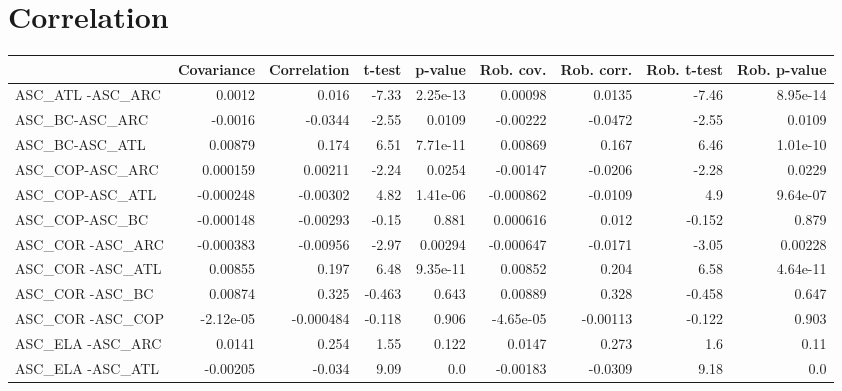 \section{Correlation}
\begin{tabular}{lrrrrrrrr}
\toprule
{} &  Covariance &  Correlation &  t-test &  p-value &  Rob. cov. &  Rob. corr. &  Rob. t-test &  Rob. p-value \\
\midrule
ASC\_ATL -ASC\_ARC                       &      0.0012 &        0.016 &   -7.33 & 2.25e-13 &    0.00098 &      0.0135 &        -7.46 &      8.95e-14 \\
ASC\_BC-ASC\_ARC                         &     -0.0016 &      -0.0344 &   -2.55 &   0.0109 &   -0.00222 &     -0.0472 &        -2.55 &        0.0109 \\
ASC\_BC-ASC\_ATL                         &     0.00879 &        0.174 &    6.51 & 7.71e-11 &    0.00869 &       0.167 &         6.46 &      1.01e-10 \\
ASC\_COP-ASC\_ARC                        &    0.000159 &      0.00211 &   -2.24 &   0.0254 &   -0.00147 &     -0.0206 &        -2.28 &        0.0229 \\
ASC\_COP-ASC\_ATL                        &   -0.000248 &     -0.00302 &    4.82 & 1.41e-06 &  -0.000862 &     -0.0109 &          4.9 &      9.64e-07 \\
ASC\_COP-ASC\_BC                         &   -0.000148 &     -0.00293 &   -0.15 &    0.881 &   0.000616 &       0.012 &       -0.152 &         0.879 \\
ASC\_COR -ASC\_ARC                       &   -0.000383 &     -0.00956 &   -2.97 &  0.00294 &  -0.000647 &     -0.0171 &        -3.05 &       0.00228 \\
ASC\_COR -ASC\_ATL                       &     0.00855 &        0.197 &    6.48 & 9.35e-11 &    0.00852 &       0.204 &         6.58 &      4.64e-11 \\
ASC\_COR -ASC\_BC                        &     0.00874 &        0.325 &  -0.463 &    0.643 &    0.00889 &       0.328 &       -0.458 &         0.647 \\
ASC\_COR -ASC\_COP                       &   -2.12e-05 &    -0.000484 &  -0.118 &    0.906 &  -4.65e-05 &    -0.00113 &       -0.122 &         0.903 \\
ASC\_ELA -ASC\_ARC                       &      0.0141 &        0.254 &    1.55 &    0.122 &     0.0147 &       0.273 &          1.6 &          0.11 \\
ASC\_ELA -ASC\_ATL                       &    -0.00205 &       -0.034 &    9.09 &      0.0 &   -0.00183 &     -0.0309 &         9.18 &           0.0 \\

\end{tabular}
